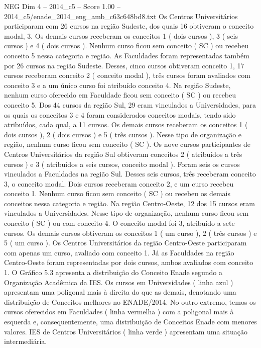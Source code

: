 \begin{textsample}{NEG Dim 4 – 2014\_c5 – Score 1.00 – 2014\_c5/enade\_2014\_eng\_amb\_c63c648bd8.txt}
Os Centros Universitários participaram com 26 cursos na região Sudeste, dos quais 16 obtiveram o conceito modal, 3.
Os demais cursos receberam os conceitos 1 ( dois cursos ), 3 ( seis cursos ) e 4 ( dois cursos ).
Nenhum curso ficou sem conceito ( SC ) ou recebeu conceito 5 nessa categoria e região.
As Faculdades foram representadas também por 26 cursos na região Sudeste.
Desses, cinco cursos obtiveram conceito 1, 17 cursos receberam conceito 2 ( conceito modal ), três cursos foram avaliados com conceito 3 e a um único curso foi atribuído conceito 4.
Na região Sudeste, nenhum curso oferecido em Faculdade ficou sem conceito ( SC ) ou recebeu conceito 5.
Dos 44 cursos da região Sul, 29 eram vinculados a Universidades, para os quais os conceitos 3 e 4 foram considerados conceitos modais, tendo sido atribuídos, cada qual, a 11 cursos.
Os demais cursos receberam os conceitos 1 ( dois cursos ), 2 ( dois cursos ) e 5 ( três cursos ).
Nesse tipo de organização e região, nenhum curso ficou sem conceito ( SC ).
Os nove cursos participantes de Centros Universitários da região Sul obtiveram conceitos 2 ( atribuídos a três cursos ) e 3 ( atribuídos a seis cursos, conceito modal ).
Foram seis os cursos vinculados a Faculdades na região Sul.
Desses seis cursos, três receberam conceito 3, o conceito modal.
Dois cursos receberam conceito 2, e um curso recebeu conceito 1.
Nenhum curso ficou sem conceito ( SC ) ou recebeu os demais conceitos nessa categoria e região.
Na região Centro-Oeste, 12 dos 15 cursos eram vinculados a Universidades.
Nesse tipo de organização, nenhum curso ficou sem conceito ( SC ) ou com conceito 4.
O conceito modal foi 3, atribuído a sete cursos.
Os demais cursos obtiveram os conceitos 1 ( um curso ), 2 ( três cursos ) e 5 ( um curso ).
Os Centros Universitários da região Centro-Oeste participaram com apenas um curso, avaliado com conceito 1.
Já as Faculdades na região Centro-Oeste foram representadas por dois cursos, ambos avaliados com conceito 1.
O Gráfico 5.3 apresenta a distribuição do Conceito Enade segundo a Organização Acadêmica da IES.
Os cursos em Universidades ( linha azul ) apresentam uma poligonal mais à direita do que as demais, denotando uma distribuição de Conceitos melhores no ENADE/2014.
No outro extremo, temos os cursos oferecidos em Faculdades ( linha vermelha ) com a poligonal mais à esquerda e, consequentemente, uma distribuição de Conceitos Enade com menores valores.
IES de Centros Universitários ( linha verde ) apresentam uma situação intermediária.

\end{textsample}

